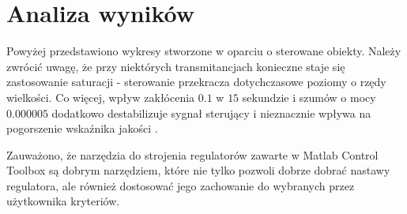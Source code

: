 \chapter{Analiza wyników}
\label{cha:rozw}
 
 Powyżej przedstawiono wykresy stworzone w oparciu o sterowane obiekty. Należy zwrócić uwagę, że przy niektórych transmitancjach konieczne staje się zastosowanie saturacji - sterowanie przekracza dotychczasowe poziomy o rzędy wielkości.  Co więcej, wpływ zakłócenia $0.1$ w $15$ sekundzie i szumów o mocy $0.000005$ dodatkowo destabilizuje sygnał sterujący i nieznacznie wpływa na pogorszenie wskaźnika jakości .
 
 Zauważono, że narzędzia do strojenia regulatorów zawarte w Matlab Control Toolbox są dobrym narzędziem, które nie tylko pozwoli dobrze dobrać nastawy regulatora, ale również dostosować jego zachowanie do wybranych przez użytkownika kryteriów.